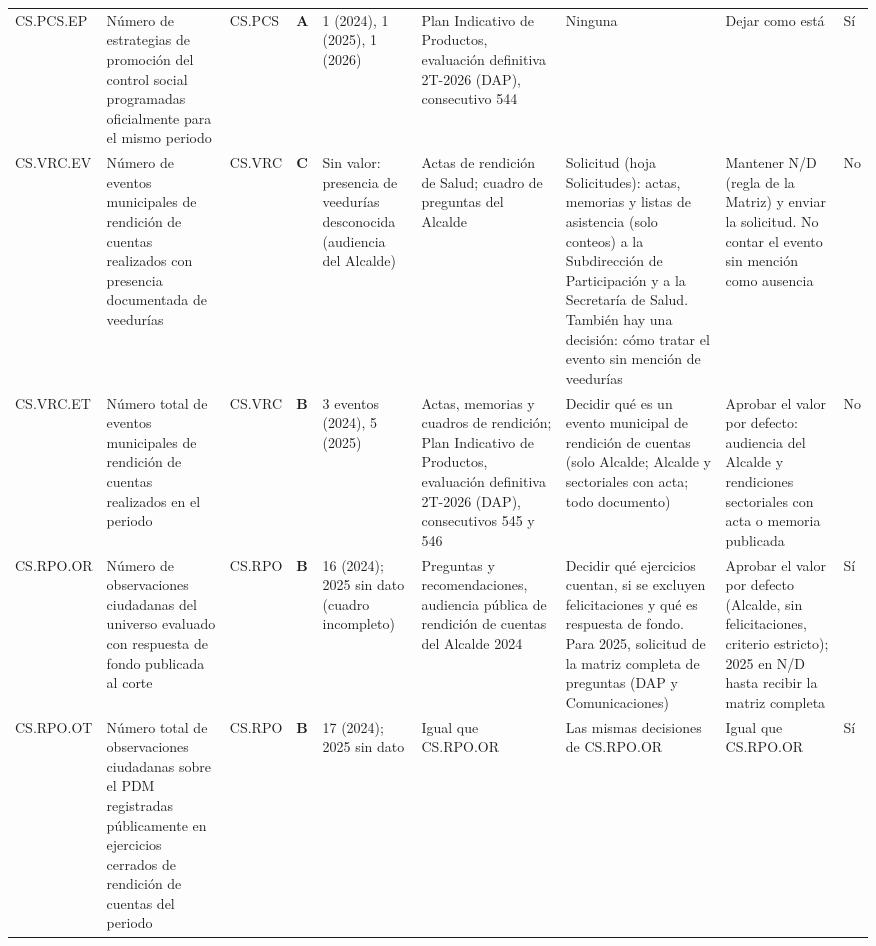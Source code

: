 \documentclass[11pt,letterpaper]{article}
\begin{document}
{\begin{xltabular}{\linewidth}{L{1.94cm}L{2.56cm}L{2.04cm}L{1.12cm}L{2.87cm}L{2.87cm}L{2.71cm}L{2.77cm}L{2.04cm}}
CS.PCS.EP & Número de estrategias de promoción del control social programadas oficialmente para el mismo periodo & CS.PCS & \textbf{A} & 1 (2024), 1 (2025), 1 (2026) & Plan Indicativo de Productos, evaluación definitiva 2T-2026 (DAP), consecutivo 544 & Ninguna & Dejar como está & Sí \\
CS.VRC.EV & Número de eventos municipales de rendición de cuentas realizados con presencia documentada de veedurías & CS.VRC & \textbf{C} & Sin valor: presencia de veedurías desconocida (audiencia del Alcalde) & Actas de rendición de Salud; cuadro de preguntas del Alcalde & Solicitud (hoja Solicitudes): actas, memorias y listas de asistencia (solo conteos) a la Subdirección de Participación y a la Secretaría de Salud. También hay una decisión: cómo tratar el evento sin mención de veedurías & Mantener N/D (regla de la Matriz) y enviar la solicitud. No contar el evento sin mención como ausencia & No \\
CS.VRC.ET & Número total de eventos municipales de rendición de cuentas realizados en el periodo & CS.VRC & \textbf{B} & 3 eventos (2024), 5 (2025) & Actas, memorias y cuadros de rendición; Plan Indicativo de Productos, evaluación definitiva 2T-2026 (DAP), consecutivos 545 y 546 & Decidir qué es un evento municipal de rendición de cuentas (solo Alcalde; Alcalde y sectoriales con acta; todo documento) & Aprobar el valor por defecto: audiencia del Alcalde y rendiciones sectoriales con acta o memoria publicada & No \\
CS.RPO.OR & Número de observaciones ciudadanas del universo evaluado con respuesta de fondo publicada al corte & CS.RPO & \textbf{B} & 16 (2024); 2025 sin dato (cuadro incompleto) & Preguntas y recomendaciones, audiencia pública de rendición de cuentas del Alcalde 2024 & Decidir qué ejercicios cuentan, si se excluyen felicitaciones y qué es respuesta de fondo. Para 2025, solicitud de la matriz completa de preguntas (DAP y Comunicaciones) & Aprobar el valor por defecto (Alcalde, sin felicitaciones, criterio estricto); 2025 en N/D hasta recibir la matriz completa & Sí \\
CS.RPO.OT & Número total de observaciones ciudadanas sobre el PDM registradas públicamente en ejercicios cerrados de rendición de cuentas del periodo & CS.RPO & \textbf{B} & 17 (2024); 2025 sin dato & Igual que CS.RPO.OR & Las mismas decisiones de CS.RPO.OR & Igual que CS.RPO.OR & Sí \\

\end{xltabular}}
\end{document}
